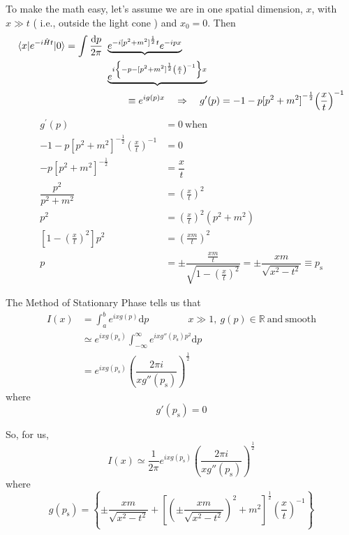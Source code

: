 \documentclass{article}
\begin{document}
\noindent To make the math easy, let's assume we are in one spatial dimension, $x$, with $ x \gg t $ ( i.e., outside the light cone ) and $ x_0 = 0 $.
Then
\begin{align*}
\braket{ x | e^{ -i \hat{H} t } | 0 } = \int \dfrac{\mathrm{d} p}{2 \pi} ~ & \underbrace{e^{ -i {[ p^2 + m^2 ]}^\frac{1}{2} t  } e^{ -i p x }} \\
& \underbrace{e^{ i \left\lbrace -p - {[ p^2 + m^2 ]}^\frac{1}{2} {\left( \frac{x}{t} \right)}^{-1} \right\rbrace x }} \\
&\qquad \equiv e^{ i g(p) x } \quad \Rightarrow \quad g^\prime (p) = -1 - p {[ p^2 + m^2 ]}^{ -\frac{1}{2} } {\left( \frac{x}{t} \right)}^{-1}
\end{align*}
\begin{align*}
g^\prime (p) &= 0 ~ \mathrm{when} \\
-1 - p {[ p^2 + m^2 ]}^{ -\frac{1}{2} } {\left( \frac{x}{t} \right)}^{-1} &= 0 \\
-p {[ p^2 + m^2 ]}^{ -\frac{1}{2} } &= \dfrac{x}{t} \\
\dfrac{p^2}{ p^2 + m^2 } &= {\left( \frac{x}{t} \right)}^2 \\
p^2 &= {\left( \frac{x}{t} \right)}^2 \left( p^2 + m^2 \right) \\
\left[ 1 - {\left( \frac{x}{t} \right)}^2 \right] p^2 &= {\left( \frac{ x m }{t} \right)}^2 \\
p &= \pm \dfrac{ \frac{ x m }{t} }{ \sqrt{ 1 - {\left( \frac{x}{t} \right)}^2 } } = \pm \dfrac{ x m }{ \sqrt{ x^2 - t^2 } } \equiv p_\mathrm{s}
\end{align*}


\noindent The Method of Stationary Phase tells us that
\begin{align*}
I(x) &= \int_a^b e^{ i x g(p) } \mathrm{d}p \qquad \qquad x \gg 1, ~ g(p) \in \mathbb{R} ~ \mathrm{and} ~ \mathrm{smooth} \\
&\simeq e^{ i x g(p_\mathrm{s}) } \int_{-\infty}^{\infty} e^{ i x g'' (p_\mathrm{s}) p^2 } \mathrm{d}p \\
&= e^{ i x g(p_\mathrm{s}) } {\left( \dfrac{ 2 \pi i }{ x g'' (p_\mathrm{s}) } \right)}^\frac{1}{2}
\end{align*}
where
\begin{equation*}
    g' (p_\mathrm{s}) = 0
\end{equation*}

\noindent So, for us,
\begin{equation*}
    I (x) \simeq \frac{1}{2 \pi} e^{ i x g (p_\mathrm{s}) } {\left( \dfrac{ 2 \pi i }{ x g'' (p_\mathrm{s}) } \right)}^\frac{1}{2}
\end{equation*}
where
\begin{equation*}
    g (p_\mathrm{s}) = \left\lbrace \pm \dfrac{x m}{\sqrt{ x^2 - t^2 }} + {\left[ {\left( \pm \dfrac{x m}{\sqrt{ x^2 - t^2 }} \right)}^2 + m^2 \right]}^\frac{1}{2} {\left( \dfrac{x}{t} \right)}^{-1} \right\rbrace
\end{equation*}
\end{document}
